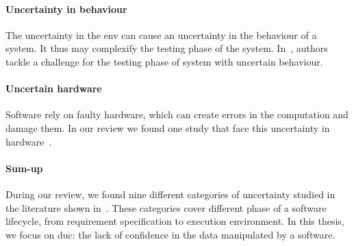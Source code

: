 \paragraph{Uncertainty in \gls{behaviour}}
The uncertainty in the \gls{env} can cause an uncertainty in the behaviour of a system.
It thus may complexify the testing phase of the system.
In~\cite{DBLP:journals/sosym/Zhang00NO19}, authors tackle a challenge for the testing phase of system with uncertain \gls{behaviour}.
	
\paragraph{Uncertain hardware}
Software rely on faulty hardware, which can create errors in the computation and damage them.
In our review we found one study that face this uncertainty in hardware~\cite{DBLP:conf/oopsla/CarbinMR13}.

\paragraph{Sum-up}
During our review, we found nine different categories of uncertainty studied in the literature shown in~.
These categories cover different phase of a software lifecycle, from requirement specification to execution environment.
In this thesis, we focus on \gls{duc}: the lack of confidence in the data manipulated by a software.

